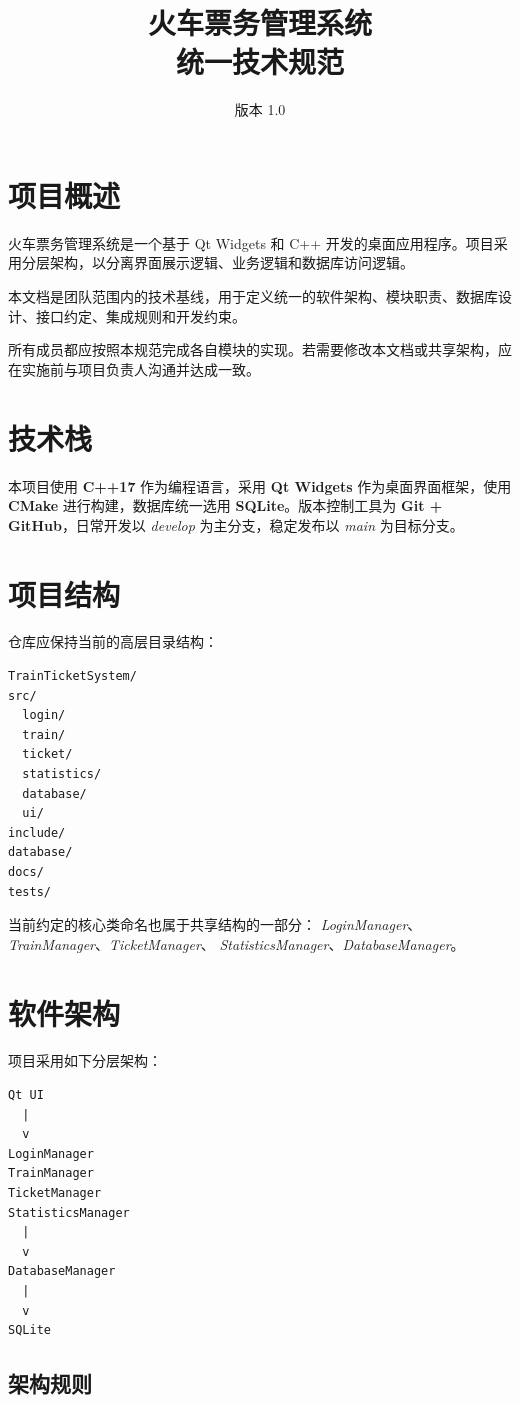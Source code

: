 \documentclass[10pt,twocolumn]{ctexart}
\title{\textbf{火车票务管理系统}\\统一技术规范}
\author{}
\date{版本 1.0}
\begin{document}
\maketitle
\thispagestyle{empty}

\section{项目概述}
火车票务管理系统是一个基于 Qt Widgets 和 C++ 开发的桌面应用程序。项目采用分层架构，以分离界面展示逻辑、业务逻辑和数据库访问逻辑。

本文档是团队范围内的技术基线，用于定义统一的软件架构、模块职责、数据库设计、接口约定、集成规则和开发约束。

所有成员都应按照本规范完成各自模块的实现。若需要修改本文档或共享架构，应在实施前与项目负责人沟通并达成一致。

\section{技术栈}
本项目使用 \textbf{C++17} 作为编程语言，采用 \textbf{Qt Widgets} 作为桌面界面框架，使用 \textbf{CMake} 进行构建，数据库统一选用 \textbf{SQLite}。版本控制工具为 \textbf{Git + GitHub}，日常开发以 \textit{develop} 为主分支，稳定发布以 \textit{main} 为目标分支。

\section{项目结构}
仓库应保持当前的高层目录结构：

\begin{verbatim}
TrainTicketSystem/
src/
  login/
  train/
  ticket/
  statistics/
  database/
  ui/
include/
database/
docs/
tests/
\end{verbatim}

当前约定的核心类命名也属于共享结构的一部分：
\textit{LoginManager}、\textit{TrainManager}、\textit{TicketManager}、
\textit{StatisticsManager}、\textit{DatabaseManager}。

\section{软件架构}
项目采用如下分层架构：

\begin{verbatim}
Qt UI
  |
  v
LoginManager
TrainManager
TicketManager
StatisticsManager
  |
  v
DatabaseManager
  |
  v
SQLite
\end{verbatim}

\subsection*{架构规则}
\end{document}

